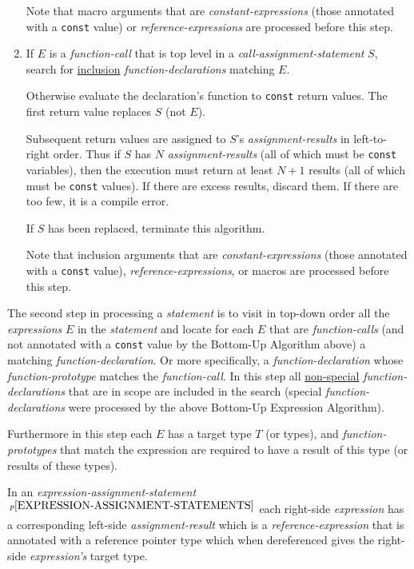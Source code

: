 \documentclass[12pt]{article}
\newcommand{\pagnote}[1]{$\,^{p\pageref{#1}}$}
\begin{document}
\begin{enumerate}
Note that macro arguments that are {\em constant-expressions}
(those annotated with a {\tt const} value) or {\em reference-expressions}
are processed before this step.

\item\label{INCLUSION-FUNCTION-STEP}
If $E$ is a {\em function-call}
that is top level in a {\em call-assignment-statement} $S$,
search for \underline{inclusion} {\em function-declarations}
matching $E$.

Otherwise evaluate the declaration's function to {\tt const} return values.
The first return value replaces $S$ (not $E$).

Subsequent return values are assigned to $S$'s {\em assignment-results}
in left-to-right order.
Thus if $S$
has $N$ {\em assignment-results} (all of which must be {\tt const} variables),
then the execution must return at
least $N+1$ results (all of which must be {\tt const} values).
If there are excess results, discard them.  If there are too few,
it is a compile error.

If $S$ has been replaced, terminate this algorithm.

Note that inclusion arguments that are {\em constant-expressions}
(those annotated with a {\tt const} value), {\em reference-expressions},
or macros are processed before this step.

\end{enumerate}

The second step in processing a {\em statement} is to visit in top-down order
all the {\em expressions} $E$ in the {\em statement}
and locate for each $E$ that are {\em function-calls}
(and not annotated with a {\tt const} value by the Bottom-Up Algorithm above)
a matching {\em function-declaration}.  Or more specifically,
a {\em function-declaration} whose {\em function-prototype} matches
the {\em function-call}.  In this step all \underline{non-special}
{\em function-declarations} that are in scope are included in the search
(special {\em function-declarations} were processed by the above
Bottom-Up Expression Algorithm).

Furthermore in this step each $E$ has a target type $T$ (or types),
and {\em function-prototypes} that match the expression are required to
have a result of this type (or results of these types).

In an {\em expression-assignment-statement}%
\pagnote{EXPRESSION-ASSIGNMENT-STATEMENTS} each right-side {\em expression}
has a corresponding left-side {\em assignment-result} which is a
{\em reference-expression} that is annotated with a reference pointer type
which when dereferenced gives the right-side {\em expression's} target type.
\end{document}
